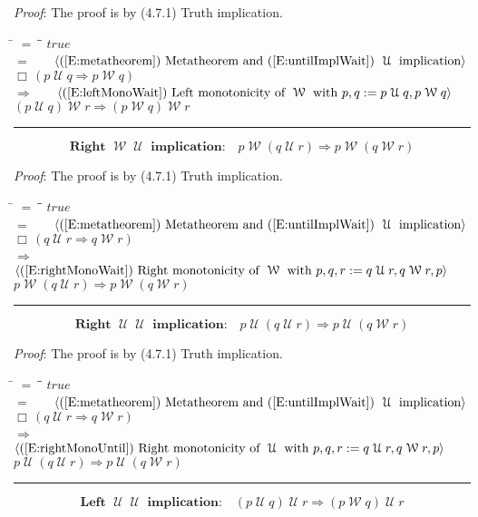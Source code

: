 \documentclass[12pt, fleqn, leqno]{article}
\newcommand{\lgap}{2pt}                             %
\newcommand{\mymathindent}{24pt}                    %
\newcommand{\impl}{\ensuremath{\Rightarrow}}        %
\newcommand{\Until}{\;\mathcal{U}\;}
\newcommand{\Wait}{\;\mathcal{W}\;}
\newcommand{\Always}{\Box\,}
\newcommand{\myqed}{\rule[-.23ex]{1.2ex}{2.0ex}}
\newcommand{\myqedtab}{\hspace{384pt}}              %
\newcommand{\Gll} {\langle}                         %
\newcommand{\Ggg} {\rangle}                         %
\newcommand{\Hint}[1]     {\ \ \ $\Gll              \mbox{#1} \Ggg$ }   %
\begin{document}
\emph{Proof}: The proof is by (4.7.1) Truth implication.
\begin{tabbing}
\hspace{\mymathindent} \= $= \;$ \= \myqedtab \= \kill
  \> \>   $true$\\[\lgap]
  \> $=$ \> \Hint{(\ref{E:metatheorem}) Metatheorem and (\ref{E:untilImplWait}) $\Until$ implication} \\[\lgap]
  \> \>   $\Always (p \Until q \impl p\Wait q)$\\[\lgap]
  \> $\impl$  \>  \Hint{(\ref{E:leftMonoWait}) Left monotonicity of $\Wait$ with $p,q := p \Until q, p\Wait q$}\\[\lgap]
  \> \>   $(p\Until q)\Wait r\impl (p\Wait q)\Wait r$ \quad \myqed
\end{tabbing}
\begin{equation}\label{E:RightWaitUntilImpl}
\textbf{Right $\Wait\Until$ implication:}\quad p\Wait (q\Until r)\impl p\Wait (q\Wait r)
\end{equation}

\emph{Proof}: The proof is by (4.7.1) Truth implication.
\begin{tabbing}
\hspace{\mymathindent} \= $= \;$ \= \myqedtab \= \kill
  \> \>   $true$\\[\lgap]
  \> $=$ \> \Hint{(\ref{E:metatheorem}) Metatheorem and (\ref{E:untilImplWait}) $\Until$ implication} \\[\lgap]
  \> \>   $\Always (q \Until r \impl q\Wait r)$\\[\lgap]
  \> $\impl$  \>  \Hint{(\ref{E:rightMonoWait}) Right monotonicity of $\Wait$ with $p,q,r := q \Until r, q\Wait r,p$}\\[\lgap]
  \> \>   $p\Wait (q\Until r)\impl p\Wait (q\Wait r)$ \quad \myqed
\end{tabbing}
\begin{equation}\label{E:RightUntilUntilImpl}
\textbf{Right $\Until\Until$ implication:}\quad p\Until (q\Until r)\impl p\Until (q\Wait r)
\end{equation}

\emph{Proof}: The proof is by (4.7.1) Truth implication.
\begin{tabbing}
\hspace{\mymathindent} \= $= \;$ \= \myqedtab \= \kill
  \> \>   $true$\\[\lgap]
  \> $=$ \> \Hint{(\ref{E:metatheorem}) Metatheorem and (\ref{E:untilImplWait}) $\Until$ implication} \\[\lgap]
  \> \>   $\Always (q \Until r \impl q\Wait r)$\\[\lgap]
  \> $\impl$  \>  \Hint{(\ref{E:rightMonoUntil}) Right monotonicity of $\Until$ with $p,q,r := q \Until r, q\Wait r,p$}\\[\lgap]
  \> \>   $p\Until (q\Until r)\impl p\Until (q\Wait r)$ \quad \myqed
\end{tabbing}
\begin{equation}\label{E:LeftUntilUntilImpl}
\textbf{Left $\Until\Until$ implication:}\quad (p\Until q)\Until r\impl (p\Wait q)\Until r
\end{equation}
\end{document}
